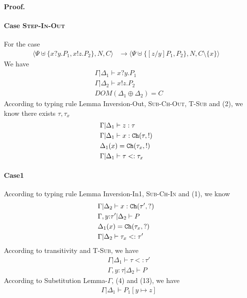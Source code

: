 \documentclass[master,english]{kuisthesis}
\theoremstyle{definition}
\begin{document}
\paragraph{Proof.}

\paragraph{Case \textsc{Step-In-Out}} For the case
\begin{align*}
    \langle\Psi \uplus\{x?y.P_1, x!z.P_2\}, N, C\rangle &\longrightarrow \langle\Psi \uplus\{[z / y]P_1, P_2\}, N, C \setminus \{x\}\rangle
\end{align*}\noindent
We have
\begin{align}
    &\Gamma | \Delta_1 \vdash x?y.P_1
    \\&\Gamma | \Delta_2 \vdash x!z.P_2
    \\&DOM(\Delta_1 \oplus \Delta_2) = C
\end{align}\noindent
According to typing rule Lemma Inversion-Out, \textsc{Sub-Ch-Out}, \textsc{T-Sub} and (2), we know there exists $\tau, \tau_x$
\begin{align}
    &\Gamma | \Delta_1 \vdash z : \tau
    \\&\Gamma | \Delta_1 \vdash x : {\tt Ch}({\tau, !})
    \\&\Delta_1(x) = {\tt Ch}({\tau_x, !})
    \\&\Gamma | \Delta_1 \vdash \tau <: \tau_x
\end{align}\noindent
\paragraph{Case1}
According to typing rule Lemma Inversion-In1, \textsc{Sub-Ch-In} and (1), we know
\begin{align}
    &\Gamma | \Delta_2 \vdash x : {\tt Ch}({\tau', ?})
    \\&\Gamma, y{:}\tau' | \Delta_2 \vdash P 
    \\&\Delta_1(x) = {\tt Ch}({\tau_x, ?})
     \\&\Gamma | \Delta_2 \vdash \tau_x <: \tau'
\end{align}\noindent
According to transitivity and \textsc{T-Sub}, we have
\begin{align}
    &\Gamma | \Delta_1 \vdash \tau <: \tau'
    \\&\Gamma, y{:}\tau | \Delta_2 \vdash P
\end{align}\noindent
According to Substitution Lemma-$\Gamma$, (4) and (13), we have
\begin{align}
    &\Gamma | \Delta_1 \vdash P_1[y \mapsto z]
\end{align}\noindent
\end{document}

